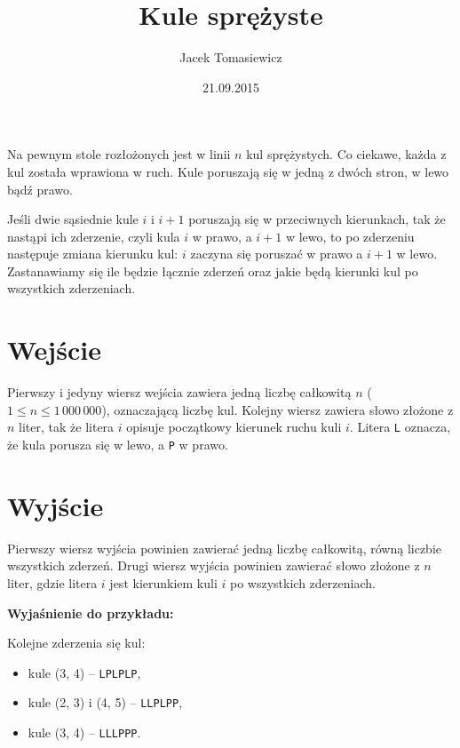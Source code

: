 \documentclass[zad,zawodnik,utf8]{sinol}
\title{Kule sprężyste}
\author{Jacek Tomasiewicz}
\date{21.09.2015}
\begin{document}
  \begin{tasktext}%
Na pewnym stole rozłożonych jest w linii $n$ kul sprężystych. Co ciekawe, każda z kul została wprawiona  w ruch. Kule poruszają się w jedną z dwóch stron, w lewo bądź prawo.

Jeśli dwie sąsiednie kule $i$ i $i+1$ poruszają się w przeciwnych kierunkach, tak że nastąpi ich  zderzenie, czyli kula $i$ w prawo, a $i+1$ w lewo, to po zderzeniu następuje zmiana kierunku kul: $i$  zaczyna się poruszać w prawo a $i+1$ w lewo. Zastanawiamy się ile będzie łącznie zderzeń oraz jakie będą kierunki kul po wszystkich zderzeniach.

  \section{Wejście}
Pierwszy i jedyny wiersz wejścia zawiera jedną liczbę całkowitą $n$ ($1 \leq n \leq 1\,000\,000$),  oznaczającą liczbę kul. Kolejny wiersz zawiera słowo złożone z $n$ liter, tak że litera $i$ opisuje początkowy kierunek ruchu kuli $i$. Litera \texttt{L} oznacza, że kula porusza się w lewo, a \texttt{P} w prawo.

  \section{Wyjście}
Pierwszy wiersz wyjścia powinien zawierać jedną liczbę całkowitą, równą liczbie wszystkich zderzeń.
Drugi wiersz wyjścia powinien zawierać słowo złożone z $n$ liter, gdzie litera $i$ jest kierunkiem kuli $i$ po wszystkich zderzeniach.

     \makecompactexample

\medskip
  \noindent
  \textbf{Wyjaśnienie do przykładu:} 

Kolejne zderzenia się kul:
\begin{itemize}
\item kule (3, 4) -- \texttt{LPLPLP},
\item kule (2, 3) i (4, 5) -- \texttt{LLPLPP},
\item kule (3, 4) -- \texttt{LLLPPP}.
\end{itemize}

  \end{tasktext}
\end{document}
